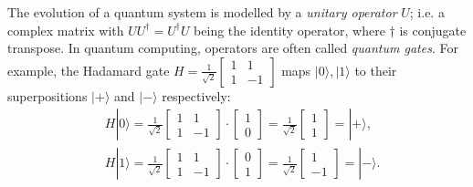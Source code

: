 \documentclass[conference,compsoc, 10pt]{IEEEtran}
\def\>{\ensuremath{\rangle}}
\begin{document}
\begin{appendices}
		The evolution of a quantum system is modelled by a \emph{unitary operator}
		$U$; i.e.  a complex matrix with $UU^\dag=U^\dag U$ being the identity
		operator, where $\dag$ is conjugate transpose. In quantum computing, operators
		are often called \emph{quantum gates}. For example, the Hadamard gate
		$H=\frac{1}{\sqrt{2}}\left[\begin{array}{cc} 1 & 1 \\ 1 & -1
		\end{array}\right]$ maps $|0\>, |1\>$ to their superpositions
		$|+\>$ and $|-\>$ respectively:
		\begin{align*}
		&H|0\> = \frac{1}{\sqrt{2}}\left[\begin{array}{cc} 1 & 1 \\ 1 & -1
		\end{array}\right]\cdot\left[\begin{array}{c} 1 \\ 0\end{array} \right] = \frac{1}{\sqrt{2}}\left[\begin{array}{c} 1 \\ 1\end{array} \right] = |+\>,\\
		&H|1\> = \frac{1}{\sqrt{2}}\left[\begin{array}{cc} 1 & 1 \\ 1 & -1
		\end{array}\right]\cdot\left[\begin{array}{c} 0 \\ 1\end{array} \right] = \frac{1}{\sqrt{2}}\left[\begin{array}{c} 1 \\ -1\end{array} \right] = |-\>.
		\end{align*}
		

\end{appendices}
\end{document}
